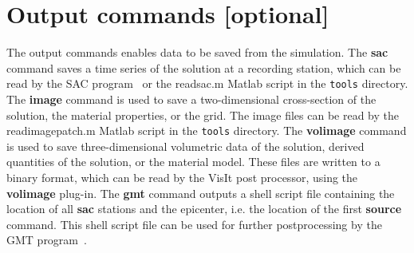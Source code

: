 \documentclass[11pt]{report}
\begin{document}
\section{Output commands [optional]}

The output commands enables data to be saved from the simulation. The {\bf sac} command saves a time
series of the solution at a recording station, which can be read by the SAC
program~\cite{Goldstein-et-al} or the readsac.m Matlab script in the {\tt tools} directory. The {\bf
  image} command is used to save a two-dimensional cross-section of the solution, the material
properties, or the grid. The image files can be read by the readimagepatch.m Matlab script in the
{\tt tools} directory. The {\bf volimage} command is used to save three-dimensional volumetric data
of the solution, derived quantities of the solution, or the material model. These files are written
to a binary format, which can be read by the VisIt post processor, using the {\bf volimage}
plug-in. The {\bf gmt} command outputs a shell script file containing the location of all {\bf sac}
stations and the epicenter, i.e. the location of the first {\bf source} command. This shell script
file can be used for further postprocessing by the GMT program~\cite{WesselSmithGMT}.
\end{document}
